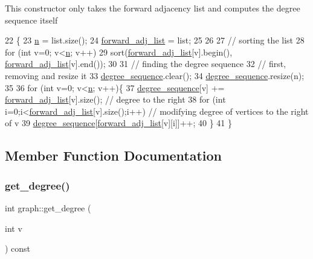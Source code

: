 This constructor only takes the forward adjacency list and computes the degree sequence itself 
\begin{DoxyCode}
22 \{
23   \hyperlink{classgraph_ac8b3474ce95c04087c312508ec1443b6}{n} = list.size();
24   \hyperlink{classgraph_a7d6441850d586d6a99fb73df57b70362}{forward\_adj\_list} = list;
25 
26 
27   \textcolor{comment}{// sorting the list}
28   \textcolor{keywordflow}{for} (\textcolor{keywordtype}{int} v=0; v<\hyperlink{classgraph_ac8b3474ce95c04087c312508ec1443b6}{n}; v++)
29     sort(\hyperlink{classgraph_a7d6441850d586d6a99fb73df57b70362}{forward\_adj\_list}[v].begin(), \hyperlink{classgraph_a7d6441850d586d6a99fb73df57b70362}{forward\_adj\_list}[v].end());
30 
31   \textcolor{comment}{// finding the degree sequence}
32   \textcolor{comment}{// first, removing and resize it}
33   \hyperlink{classgraph_a0b31295672bfe37669c9eb3640977fe6}{degree\_sequence}.clear();
34   \hyperlink{classgraph_a0b31295672bfe37669c9eb3640977fe6}{degree\_sequence}.resize(n);
35 
36   \textcolor{keywordflow}{for} (\textcolor{keywordtype}{int} v=0; v<\hyperlink{classgraph_ac8b3474ce95c04087c312508ec1443b6}{n}; v++)\{
37     \hyperlink{classgraph_a0b31295672bfe37669c9eb3640977fe6}{degree\_sequence}[v] += \hyperlink{classgraph_a7d6441850d586d6a99fb73df57b70362}{forward\_adj\_list}[v].size(); \textcolor{comment}{// degree to the right
       }
38     \textcolor{keywordflow}{for} (\textcolor{keywordtype}{int} i=0;i<\hyperlink{classgraph_a7d6441850d586d6a99fb73df57b70362}{forward\_adj\_list}[v].size();i++) \textcolor{comment}{// modifying degree of vertices to the
       right of v}
39       \hyperlink{classgraph_a0b31295672bfe37669c9eb3640977fe6}{degree\_sequence}[\hyperlink{classgraph_a7d6441850d586d6a99fb73df57b70362}{forward\_adj\_list}[v][i]]++;
40   \}
41 \}
\end{DoxyCode}


\subsection{Member Function Documentation}
\mbox{\label{classgraph_a593245054bf5ded344fbf304bcdc7fbe}} 
\subsubsection{\texorpdfstring{get\+\_\+degree()}{get\_degree()}}
{\footnotesize\ttfamily int graph\+::get\+\_\+degree (\begin{DoxyParamCaption}\item[{int}]{v }\end{DoxyParamCaption}) const}



